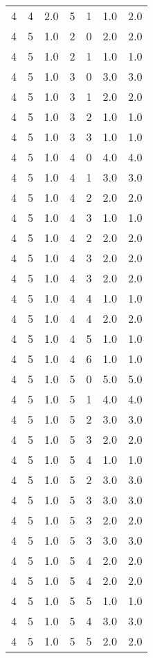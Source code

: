 \documentclass[a4paper,12pt]{article}
\begin{document}
\begin{center}
\begin{longtable}{ c c c | c c c | c }
        4 & 4 & 2.0 & 5 & 1 & 1.0 & 2.0 \\
        4 & 5 & 1.0 & 2 & 0 & 2.0 & 2.0 \\
        4 & 5 & 1.0 & 2 & 1 & 1.0 & 1.0 \\
        4 & 5 & 1.0 & 3 & 0 & 3.0 & 3.0 \\
        4 & 5 & 1.0 & 3 & 1 & 2.0 & 2.0 \\
        4 & 5 & 1.0 & 3 & 2 & 1.0 & 1.0 \\
        4 & 5 & 1.0 & 3 & 3 & 1.0 & 1.0 \\
        4 & 5 & 1.0 & 4 & 0 & 4.0 & 4.0 \\
        4 & 5 & 1.0 & 4 & 1 & 3.0 & 3.0 \\
        4 & 5 & 1.0 & 4 & 2 & 2.0 & 2.0 \\
        4 & 5 & 1.0 & 4 & 3 & 1.0 & 1.0 \\
        4 & 5 & 1.0 & 4 & 2 & 2.0 & 2.0 \\
        4 & 5 & 1.0 & 4 & 3 & 2.0 & 2.0 \\
        4 & 5 & 1.0 & 4 & 3 & 2.0 & 2.0 \\
        4 & 5 & 1.0 & 4 & 4 & 1.0 & 1.0 \\
        4 & 5 & 1.0 & 4 & 4 & 2.0 & 2.0 \\
        4 & 5 & 1.0 & 4 & 5 & 1.0 & 1.0 \\
        4 & 5 & 1.0 & 4 & 6 & 1.0 & 1.0 \\
        4 & 5 & 1.0 & 5 & 0 & 5.0 & 5.0 \\
        4 & 5 & 1.0 & 5 & 1 & 4.0 & 4.0 \\
        4 & 5 & 1.0 & 5 & 2 & 3.0 & 3.0 \\
        4 & 5 & 1.0 & 5 & 3 & 2.0 & 2.0 \\
        4 & 5 & 1.0 & 5 & 4 & 1.0 & 1.0 \\
        4 & 5 & 1.0 & 5 & 2 & 3.0 & 3.0 \\
        4 & 5 & 1.0 & 5 & 3 & 3.0 & 3.0 \\
        4 & 5 & 1.0 & 5 & 3 & 2.0 & 2.0 \\
        4 & 5 & 1.0 & 5 & 3 & 3.0 & 3.0 \\
        4 & 5 & 1.0 & 5 & 4 & 2.0 & 2.0 \\
        4 & 5 & 1.0 & 5 & 4 & 2.0 & 2.0 \\
        4 & 5 & 1.0 & 5 & 5 & 1.0 & 1.0 \\
        4 & 5 & 1.0 & 5 & 4 & 3.0 & 3.0 \\
        4 & 5 & 1.0 & 5 & 5 & 2.0 & 2.0 \\

\end{longtable}
\end{center}
\end{document}
